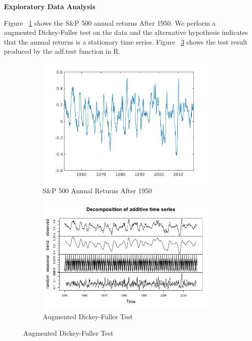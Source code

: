 \documentclass{article}
\begin{document}
\textbf{Exploratory Data Analysis}

Figure ~\ref{fig:returns} shows the S\&P 500 annual returns After 1950. We perform a augmented Dickey-Fuller test on the data and the alternative hypothesis indicates that the annual returns is a stationary time series. Figure ~\ref{fig:adf} shows the test result produced by the adf.test function in R.

\begin{figure}[H]
    \centering
    \begin{subfigure}{.5\textwidth}
        \centering
        \includegraphics[width=1\textwidth]{sp500-annual-increase.jpg}
        \caption{S\&P 500 Annual Returns After 1950}
        \label{fig:returns}
    \end{subfigure}%
    \begin{subfigure}{.5\textwidth}
        \centering
        \includegraphics[width=1\textwidth]{stationary-test.png}
        \caption{Augmented Dickey-Fuller Test}
        \label{fig:adf}
    \end{subfigure}
\end{figure}
\end{document}
